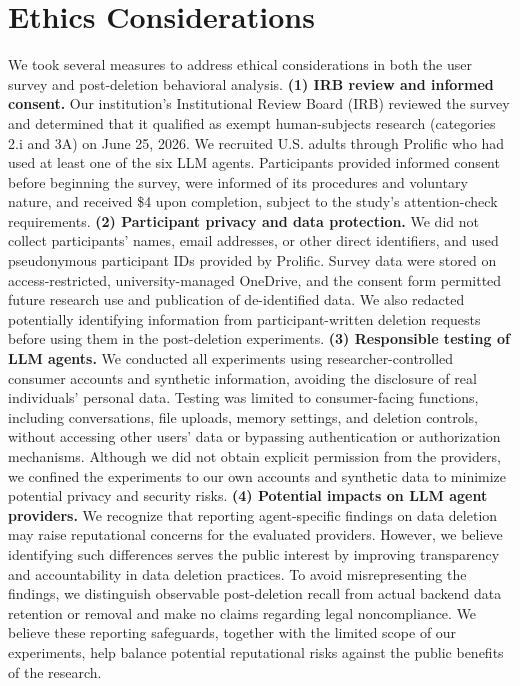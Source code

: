 \section{Ethics Considerations}
\label{sec:ethics}


We took several measures to address ethical considerations in both the user survey and post-deletion behavioral analysis.
%
\textbf{(1) IRB review and informed consent.}
%
Our institution's Institutional Review Board (IRB) reviewed the survey and determined that it qualified as exempt human-subjects research (categories 2.i and 3A) on June 25, 2026.
%
We recruited U.S. adults through Prolific who had used at least one of the six LLM agents.
%
Participants provided informed consent before beginning the survey, were informed of its procedures and voluntary nature, and received \$4 upon completion, subject to the study's attention-check requirements.
%
\textbf{(2) Participant privacy and data protection.}
%
We did not collect participants' names, email addresses, or other direct identifiers, and used pseudonymous participant IDs provided by Prolific.
%
Survey data were stored on access-restricted, university-managed OneDrive, and the consent form permitted future research use and publication of de-identified data.
%
We also redacted potentially identifying information from participant-written deletion requests before using them in the post-deletion experiments.
%
\textbf{(3) Responsible testing of LLM agents.}
%
We conducted all experiments using researcher-controlled consumer accounts and synthetic information, avoiding the disclosure of real individuals' personal data.
%
Testing was limited to consumer-facing functions, including conversations, file uploads, memory settings, and deletion controls, without accessing other users' data or bypassing authentication or authorization mechanisms.
%
Although we did not obtain explicit permission from the providers, we confined the experiments to our own accounts and synthetic data to minimize potential privacy and security risks.
%
\textbf{(4) Potential impacts on LLM agent providers.}
%
We recognize that reporting agent-specific findings on data deletion may raise reputational concerns for the evaluated providers.
%
However, we believe identifying such differences serves the public interest by improving transparency and accountability in data deletion practices.
%
To avoid misrepresenting the findings, we distinguish observable post-deletion recall from actual backend data retention or removal and make no claims regarding legal noncompliance.
%
We believe these reporting safeguards, together with the limited scope of our experiments, help balance potential reputational risks against the public benefits of the research.